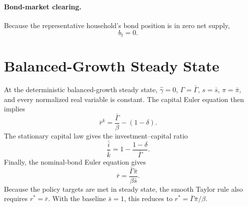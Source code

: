 \documentclass[12pt,final]{article}
\begin{document}
\paragraph{Bond-market clearing.}
Because the representative household's bond position is in zero net supply,
\begin{equation}
  b_t=0.
  \label{eq:bond-clearing}
\end{equation}

\section{Balanced-Growth Steady State}

At the deterministic balanced-growth steady state,
$\widehat\gamma=0$, $\Gamma=\bar\Gamma$, $s=\bar s$,
$\pi=\bar\pi$, and every normalized real variable is constant.  The capital
Euler equation then implies
\begin{equation}
  \bar r^k=\frac{\bar\Gamma}{\beta}-(1-\delta).
  \label{eq:ss-capital-return}
\end{equation}
The stationary capital law gives the investment--capital ratio
\begin{equation}
  \frac{\bar i}{\bar k}
  =1-\frac{1-\delta}{\bar\Gamma}.
  \label{eq:ss-investment-capital-ratio}
\end{equation}
Finally, the nominal-bond Euler equation gives
\begin{equation}
  \bar r=\frac{\bar\Gamma\bar\pi}{\beta\bar s}.
  \label{eq:ss-nominal-rate}
\end{equation}
Because the policy targets are met in steady state, the smooth Taylor rule also
requires $r^*=\bar r$.  With the baseline $\bar s=1$, this reduces to
$r^*=\bar\Gamma\bar\pi/\beta$.
\end{document}
